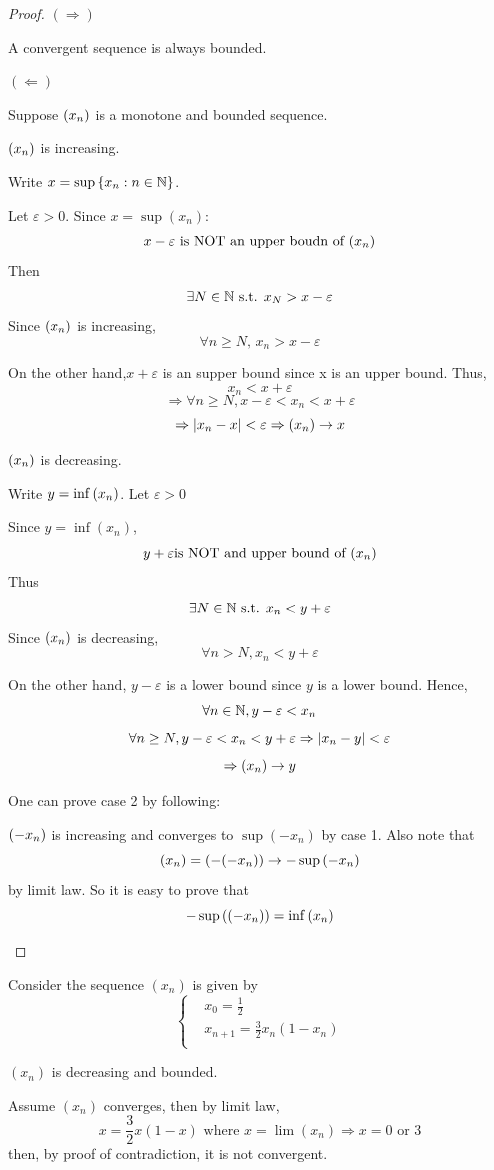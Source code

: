 \documentclass[a4paper,12pt]{article}
\begin{document}
\begin{proof}\((\Rightarrow)\)

    A convergent sequence is always bounded.

    \((\Leftarrow)\) 
    
    Suppose \((x_{n})\) is a monotone and bounded sequence.

     \((x_{n})\) is increasing.

    Write \(x = \sup{\{x_n:n\in\mathbb{N}\}}\).

    Let \(\varepsilon>0\). Since \(x = \sup{(x_n)}\):
    \[x-\varepsilon \text{ is NOT an upper boudn of } (x_{n})\]
    Then 
    \[\exists N\in\mathbb{N} \text{ s.t. } x_N > x-\varepsilon\]
    Since \((x_{n})\) is increasing,
    \[\forall n\ge N,\, x_n>x-\varepsilon\]

    On the other hand,\(x+\varepsilon\) is an supper bound since x is an upper bound. Thus,
    \[x_n<x+\varepsilon\]
    \[\Rightarrow \forall n\ge N, x-\varepsilon<x_n<x+\varepsilon\]
    \[\Rightarrow \left\lvert x_n - x\right\rvert<\varepsilon\Rightarrow(x_{n})\rightarrow x\]

     \((x_{n})\) is decreasing.

    Write \(y = \inf{(x_{n})}\). Let \(\varepsilon>0\)

    Since \(y = \inf{(x_n)}\),
    \[y+\varepsilon \text{is NOT and upper bound of }(x_{n})\]
    Thus
    \[\exists N \in\mathbb{N} \text{ s.t. } x_n<y+\varepsilon\]
    Since \((x_{n})\) is decreasing,
    \[\forall n>N, x_n<y+\varepsilon\]
    
    On the other hand, \(y-\varepsilon\) is a lower bound since \(y\) is a lower bound. Hence, 
    \[\forall n\in\mathbb{N},  y-\varepsilon<x_n\]
    \[\forall n\ge N, y-\varepsilon<x_n<y+\varepsilon \Rightarrow\left\lvert x_n-y\right\rvert<\varepsilon\]
    \[\Rightarrow (x_{n})\rightarrow y\]

    \begin{remark}
        One can prove case 2 by following: 
        
        \((-x_{n})\) is increasing and converges to \(\sup{(-x_n)}\) by case 1.
        Also note that \[(x_{n}) = (-(-x_{n}))\rightarrow -\sup{(-x_{n})}\]
        by limit law. So it is easy to prove that \[-\sup{((-x_{n}))} = \inf{(x_n)}\]
    \end{remark}
\end{proof}

\begin{example}
    Consider the sequence \((x_n)\) is given by 
        \[\begin{cases}
            & x_0 = \frac{1}{2}\\
            & x_{n+1} = \frac{3}{2}x_n(1-x_n)\\
        \end{cases}\]

    \((x_n)\) is decreasing and  bounded.

     Assume \((x_n)\) converges, then by limit law,
    \[x = \frac{3}{2}x(1-x)\text{ where }x=\lim(x_n)\Rightarrow x = 0\text{ or }3\]
    then, by proof of contradiction, it is not convergent.
\end{example}
\end{document}

